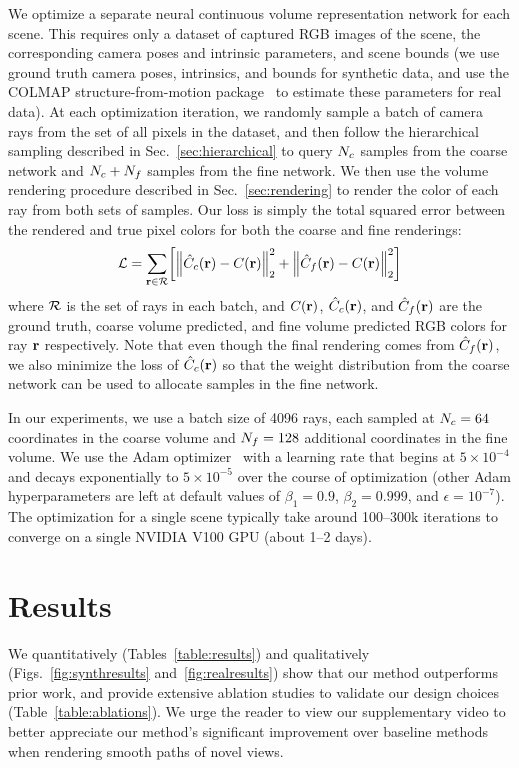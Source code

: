 \documentclass[runningheads]{llncs}
\begin{document}
We optimize a separate neural continuous volume representation network for each scene. This requires only a dataset of captured RGB images of the scene, the corresponding camera poses and intrinsic parameters, and scene bounds (we use ground truth camera poses, intrinsics, and bounds for synthetic data, and use the COLMAP structure-from-motion package~\cite{colmap} to estimate these parameters for real data). At each optimization iteration, we randomly sample a batch of camera rays from the set of all pixels in the dataset, and then follow the hierarchical sampling described in Sec.~\ref{sec:hierarchical} to query $N_c$ samples from the coarse network and $N_c+N_f$ samples from the fine network. We then use the volume rendering procedure described in Sec.~\ref{sec:rendering} to render the color of each ray from both sets of samples. Our loss is simply the total squared error between the rendered and true pixel colors for both the coarse and fine renderings:
\begin{equation}
\Ltrain=\sum_{\ray\in\raybatch}\left[\norm{\Ccoarse-\Ctrue}_2^2+\norm{\Cfine-\Ctrue}_2^2\right]
\end{equation}
where $\mathcal{R}$ is the set of rays in each batch, and $C(\mathbf{r})$, $\hat{C}_c(\mathbf{r})$, and $\hat{C}_f(\mathbf{r})$ are the ground truth, coarse volume predicted, and fine volume predicted RGB colors for ray $\mathbf{r}$ respectively. Note that even though the final rendering comes from $\hat{C}_f(\mathbf{r})$, we also minimize the loss of $\hat{C}_c(\mathbf{r})$ so that the weight distribution from the coarse network can be used to allocate samples in the fine network.

In our experiments, we use a batch size of 4096 rays, each sampled at $N_c=64$ coordinates in the coarse volume and $N_f=128$ additional coordinates in the fine volume. We use the Adam optimizer~\cite{KingmaB15} with a learning rate that begins at $5 \times 10^{-4}$ and decays exponentially to $5 \times 10^{-5}$ over the course of optimization (other Adam hyperparameters are left at default values of $\beta_1=0.9$, $\beta_2=0.999$, and $\epsilon=10^{-7}$). The optimization for a single scene typically take around 100--300k iterations to converge on a single NVIDIA V100 GPU (about 1--2 days).

\section{Results}

We quantitatively (Tables~\ref{table:results}) and qualitatively (Figs.~\ref{fig:synthresults} and~\ref{fig:realresults}) show that our method outperforms prior work, and provide extensive ablation studies to validate our design choices (Table~\ref{table:ablations}). We urge the reader to view our supplementary video to better appreciate our method's significant improvement over baseline methods when rendering smooth paths of novel views.
\end{document}
